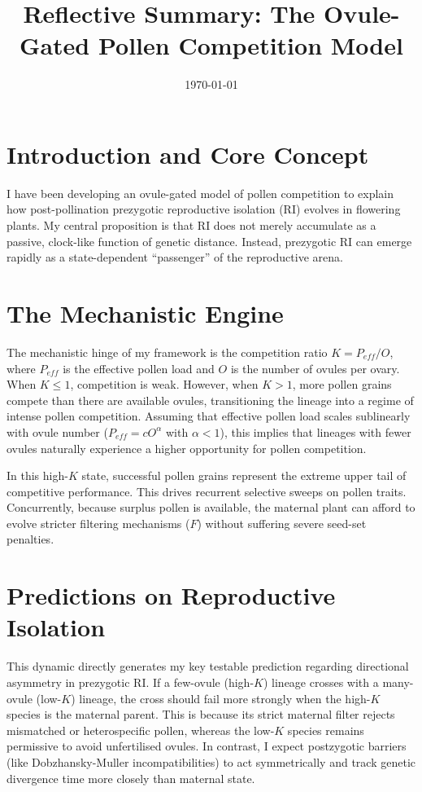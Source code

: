 \documentclass[12pt]{article}
\title{Reflective Summary: The Ovule-Gated Pollen Competition Model}
\author{}
\date{\today}
\begin{document}
\maketitle

\section*{Introduction and Core Concept}
I have been developing an ovule-gated model of pollen competition to explain how post-pollination prezygotic reproductive isolation (RI) evolves in flowering plants. My central proposition is that RI does not merely accumulate as a passive, clock-like function of genetic distance. Instead, prezygotic RI can emerge rapidly as a state-dependent ``passenger'' of the reproductive arena.

\section*{The Mechanistic Engine}
The mechanistic hinge of my framework is the competition ratio $K = P_{eff}/O$, where $P_{eff}$ is the effective pollen load and $O$ is the number of ovules per ovary. When $K \le 1$, competition is weak. However, when $K > 1$, more pollen grains compete than there are available ovules, transitioning the lineage into a regime of intense pollen competition. Assuming that effective pollen load scales sublinearly with ovule number ($P_{eff} = cO^\alpha$ with $\alpha < 1$), this implies that lineages with fewer ovules naturally experience a higher opportunity for pollen competition.

In this high-$K$ state, successful pollen grains represent the extreme upper tail of competitive performance. This drives recurrent selective sweeps on pollen traits. Concurrently, because surplus pollen is available, the maternal plant can afford to evolve stricter filtering mechanisms ($F$) without suffering severe seed-set penalties.

\section*{Predictions on Reproductive Isolation}
This dynamic directly generates my key testable prediction regarding directional asymmetry in prezygotic RI. If a few-ovule (high-$K$) lineage crosses with a many-ovule (low-$K$) lineage, the cross should fail more strongly when the high-$K$ species is the maternal parent. This is because its strict maternal filter rejects mismatched or heterospecific pollen, whereas the low-$K$ species remains permissive to avoid unfertilised ovules. In contrast, I expect postzygotic barriers (like Dobzhansky-Muller incompatibilities) to act symmetrically and track genetic divergence time more closely than maternal state.
\end{document}
